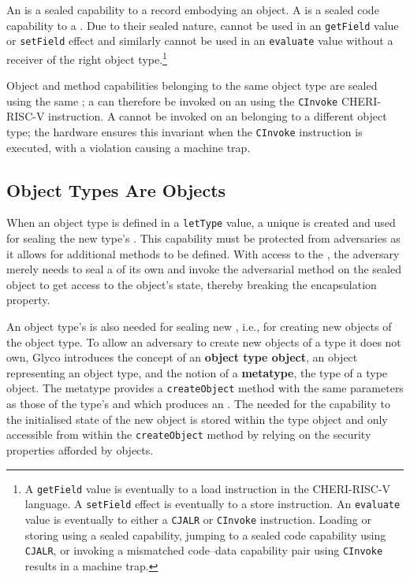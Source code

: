 \documentclass[main.tex]{subfiles}
\begin{document}
An \textbf{} is a sealed capability to a record embodying an object. A \textbf{} is a sealed code capability to a . Due to their sealed nature,  cannot be used in an \texttt{getField} value or \texttt{setField} effect and similarly  cannot be used in an \texttt{evaluate} value without a receiver of the right object type.\footnote{A \texttt{getField} value is eventually \lowered{} to a load instruction in the CHERI-RISC-V language. A \texttt{setField} effect is eventually \lowered{} to a store instruction. An \texttt{evaluate} value is eventually \lowered{} to either a \texttt{CJALR} or \texttt{CInvoke} instruction. Loading or storing using a sealed capability, jumping to a sealed code capability using \texttt{CJALR}, or invoking a mismatched code–data capability pair using \texttt{CInvoke} results in a machine trap.}

Object and method capabilities belonging to the same object type are sealed using the same ; a  can therefore be invoked on an  using the \texttt{CInvoke} CHERI-RISC-V instruction. A  cannot be invoked on an  belonging to a different object type; the hardware ensures this invariant when the \texttt{CInvoke} instruction is executed, with a violation causing a machine trap.

\subsection{Object Types Are Objects}
When an object type is defined in a \texttt{letType} value, a unique  is created and used for sealing the new type's . This capability must be protected from adversaries as it allows for additional methods to be defined. With access to the , the adversary merely needs to seal a  of its own and invoke the adversarial method on the sealed object to get access to the object's state, thereby breaking the encapsulation property.

An object type's  is also needed for sealing new , i.e., for creating new objects of the object type. To allow an adversary to create new objects of a type it does not own, Glyco introduces the concept of an \textbf{object type object}, an object representing an object type, and the notion of a \textbf{metatype}, the type of a type object. The metatype provides a \texttt{createObject} method with the same parameters as those of the type's  and which produces an . The  needed for  the capability to the initialised state of the new object is stored within the type object and only accessible from within the \texttt{createObject} method by relying on the security properties afforded by objects.
\end{document}
